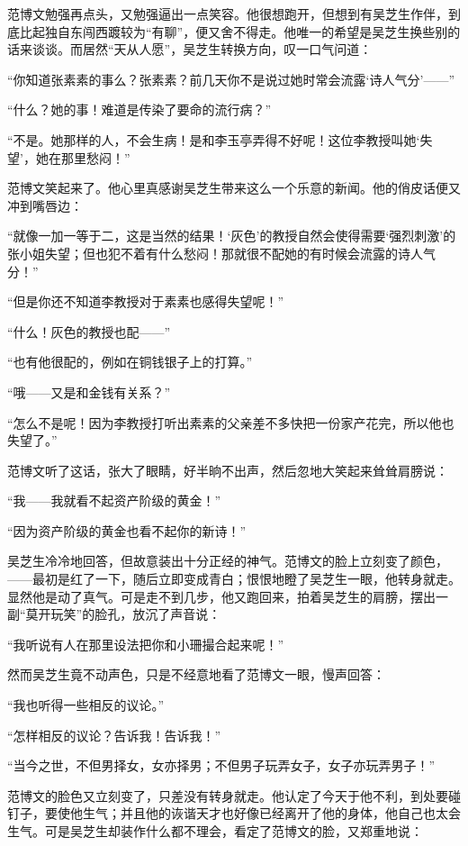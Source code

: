 \par 范博文勉强再点头，又勉强逼出一点笑容。他很想跑开，但想到有吴芝生作伴，到底比起独自东闯西踱较为“有聊”，便又舍不得走。他唯一的希望是吴芝生换些别的话来谈谈。而居然“天从人愿”，吴芝生转换方向，叹一口气问道：
\par “你知道张素素的事么？张素素？前几天你不是说过她时常会流露‘诗人气分’——”
\par “什么？她的事！难道是传染了要命的流行病？”
\par “不是。她那样的人，不会生病！是和李玉亭弄得不好呢！这位李教授叫她‘失望’，她在那里愁闷！”
\par 范博文笑起来了。他心里真感谢吴芝生带来这么一个乐意的新闻。他的俏皮话便又冲到嘴唇边：
\par “就像一加一等于二，这是当然的结果！‘灰色’的教授自然会使得需要‘强烈刺激’的张小姐失望；但也犯不着有什么愁闷！那就很不配她的有时候会流露的诗人气分！”
\par “但是你还不知道李教授对于素素也感得失望呢！”
\par “什么！灰色的教授也配——”
\par “也有他很配的，例如在铜钱银子上的打算。”
\par “哦——又是和金钱有关系？”
\par “怎么不是呢！因为李教授打听出素素的父亲差不多快把一份家产花完，所以他也失望了。”
\par 范博文听了这话，张大了眼睛，好半晌不出声，然后忽地大笑起来耸耸肩膀说：
\par “我——我就看不起资产阶级的黄金！”
\par “因为资产阶级的黄金也看不起你的新诗！”
\par 吴芝生冷冷地回答，但故意装出十分正经的神气。范博文的脸上立刻变了颜色，——最初是红了一下，随后立即变成青白；恨恨地瞪了吴芝生一眼，他转身就走。显然他是动了真气。可是走不到几步，他又跑回来，拍着吴芝生的肩膀，摆出一副“莫开玩笑”的脸孔，放沉了声音说：
\par “我听说有人在那里设法把你和小珊撮合起来呢！”
\par 然而吴芝生竟不动声色，只是不经意地看了范博文一眼，慢声回答：
\par “我也听得一些相反的议论。”
\par “怎样相反的议论？告诉我！告诉我！”
\par “当今之世，不但男择女，女亦择男；不但男子玩弄女子，女子亦玩弄男子！”
\par 范博文的脸色又立刻变了，只差没有转身就走。他认定了今天于他不利，到处要碰钉子，要使他生气；并且他的诙谐天才也好像已经离开了他的身体，他自己也太会生气。可是吴芝生却装作什么都不理会，看定了范博文的脸，又郑重地说：
